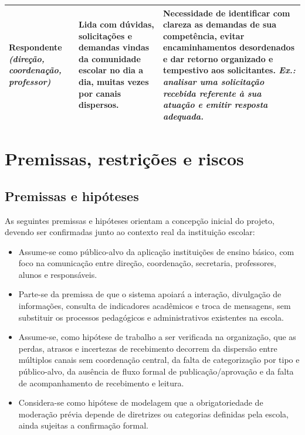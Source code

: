 \documentclass[a4paper,12pt]{report}
\begin{document}
\begin{longtable}{|p{3.2cm}|p{5.2cm}|p{6.2cm}|}
\hline
\textbf{Respondente} \newline \textit{(direção, coordenação, professor)} & Lida com dúvidas, solicitações e demandas vindas da comunidade escolar no dia a dia, muitas vezes por canais dispersos. & Necessidade de identificar com clareza as demandas de sua competência, evitar encaminhamentos desordenados e dar retorno organizado e tempestivo aos solicitantes. \textit{Ex.: analisar uma solicitação recebida referente à sua atuação e emitir resposta adequada.} \\
\hline
\end{longtable}

\section{Premissas, restrições e riscos}

\subsection{Premissas e hipóteses}
As seguintes premissas e hipóteses orientam a concepção inicial do projeto, devendo ser confirmadas junto ao contexto real da instituição escolar:
\begin{itemize}
    \item Assume-se como público-alvo da aplicação instituições de ensino básico, com foco na comunicação entre direção, coordenação, secretaria, professores, alunos e responsáveis.
    \item Parte-se da premissa de que o sistema apoiará a interação, divulgação de informações, consulta de indicadores acadêmicos e troca de mensagens, sem substituir os processos pedagógicos e administrativos existentes na escola.
    \item Assume-se, como hipótese de trabalho a ser verificada na organização, que as perdas, atrasos e incertezas de recebimento decorrem da dispersão entre múltiplos canais sem coordenação central, da falta de categorização por tipo e público-alvo, da ausência de fluxo formal de publicação/aprovação e da falta de acompanhamento de recebimento e leitura.
    \item Considera-se como hipótese de modelagem que a obrigatoriedade de moderação prévia depende de diretrizes ou categorias definidas pela escola, ainda sujeitas a confirmação formal.
\end{itemize}
\end{document}
